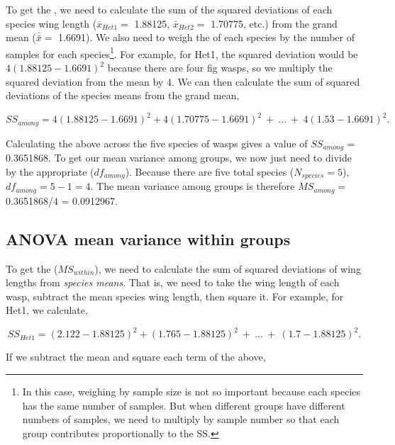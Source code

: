 \documentclass[
  openany]{krantz}
\begin{document}
To get the , we need to calculate the sum of the squared deviations of each species wing length (\(\bar{x}_{Het1} =\) 1.88125, \(\bar{x}_{Het2} =\) 1.70775, etc.) from the grand mean (\(\bar{\bar{x}} =\) 1.6691).
We also need to weigh the  of each species by the number of samples for each species\footnote{In this case, weighing by sample size is not so important because each species has the same number of samples. But when different groups have different numbers of samples, we need to multiply by sample number so that each group contributes proportionally to the SS.}.
For example, for Het1, the squared deviation would be \(4(1.88125 - 1.6691)^{2}\) because there are four fig wasps, so we multiply the squared deviation from the mean by 4.
We can then calculate the sum of squared deviations of the species means from the grand mean,

\[SS_{among} = 4(1.88125 - 1.6691)^{2} + 
               4(1.70775 - 1.6691)^{2}\:+\: ... \:
               +\:4(1.53 - 1.6691)^{2}.\]

Calculating the above across the five species of wasps gives a value of \(SS_{among} =\) 0.3651868.
To get our mean variance among groups, we now just need to divide by the appropriate  (\(df_{among}\)).
Because there are five total species (\(N_{species} = 5\)), \(df_{among} = 5 - 1 = 4\).
The mean variance among groups is therefore \(MS_{among} =\) 0.3651868/4 = 0.0912967.

\hypertarget{anova-mean-variance-within-groups}{%
\subsection{ANOVA mean variance within groups}\label{anova-mean-variance-within-groups}}

To get the  (\(MS_{within}\)), we need to calculate the sum of squared deviations of wing lengths from \emph{species means}.
That is, we need to take the wing length of each wasp, subtract the mean species wing length, then square it.
For example, for Het1, we calculate,

\[SS_{Het1} = (2.122 - 1.88125)^{2} +
              (1.765 - 1.88125)^{2}
               \:+\: ... \:
               +\: 
              (1.7 - 1.88125)^{2}.\]

If we subtract the mean and square each term of the above,
\end{document}
